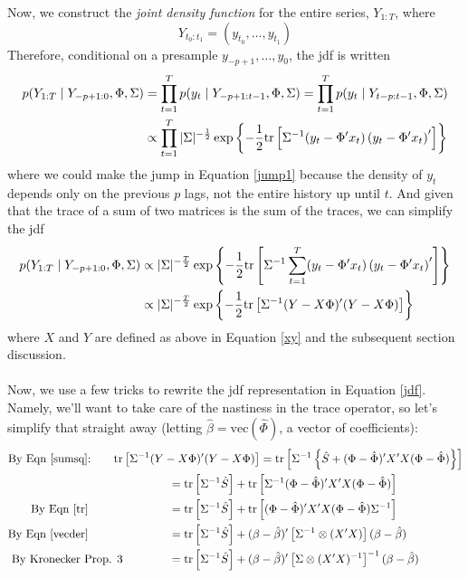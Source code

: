 \documentclass[a4paper,12pt]{scrartcl}
\begin{document}
Now, we construct the \emph{joint density function} for
the entire series, $Y_{1:T}$, where 
    \[ Y_{t_0:t_1} = (y_{t_0}, \ldots, y_{t_1}) \]
Therefore, conditional on a presample $y_{-p+1}, \ldots, y_0$, 
the jdf is written
\begin{align}
    p(Y_{1:T} \; | \; Y_{-p+1:0}, \Phi, \Sigma)
	&= \prod_{t=1}^T p(y_t \; | \; Y_{-p+1:t-1}, \Phi, 
	\Sigma) 
	= \prod_{t=1}^T p(y_t \; | \; Y_{t-p:t-1}, \Phi, \Sigma) 
	\label{jump1} \\
    &\propto \prod_{t=1}^T
	|\Sigma|^{-\frac{1}{2}} 
	\exp\left\{ -\frac{1}{2} \text{tr} \left[ \Sigma^{-1}  
	(y_t - \Phi' x_t)\left(y_t - \Phi' x_t\right)'
	\right]\right\} \notag
\end{align}
where we could make the jump in Equation \ref{jump1}  
because the density of $y_t$ depends only on the previous
$p$ lags, not the entire history up until $t$. 
And given that the trace of a sum of two matrices is the
sum of the traces, we can simplify the jdf
\begin{align}
    p(Y_{1:T} \; | \; Y_{-p+1:0}, \Phi, \Sigma)
	&\propto 
	|\Sigma|^{-\frac{T}{2}} 
	\exp\left\{ -\frac{1}{2} \text{tr} \left[ \Sigma^{-1}  
	\sum^T_{t=1} (y_t - \Phi' x_t)\left(y_t -\Phi' x_t\right)'
	\right]\right\} \notag \\
    &\propto 
	|\Sigma|^{-\frac{T}{2}} 
	\exp\left\{ -\frac{1}{2} \text{tr} \left[ \Sigma^{-1}  
	(Y - X\Phi)'(Y-X\Phi)\right]\right\} \label{jdf}
\end{align}
where $X$ and $Y$ are defined as above in Equation \ref{xy}
and the subsequent section discussion.
\\
\\
Now, we use a few tricks to rewrite the jdf representation
in Equation \ref{jdf}. Namely, we'll want to take care
of the nastiness in the trace operator, so let's simplify 
that straight away (letting $\hat{\beta} = 
\text{vec}(\hat{\Phi})$, a vector of coefficients):
\begin{align*}
    \text{By Eqn \ref{sumsq}:} \qquad 
	\text{tr} & \left[\Sigma^{-1} 
	(Y - X\Phi)'(Y-X\Phi)\right] = 
	\text{tr} \left[\Sigma^{-1} \left\{
	\hat{S} + (\Phi - \hat{\Phi})'
	X'X(\Phi - \hat{\Phi}) \right\}\right]  \\
    &\qquad\qquad= \text{tr} \left[\Sigma^{-1} 
	\hat{S} \right] + \text{tr} \left[ \Sigma^{-1}
	(\Phi - \hat{\Phi})'X'X(\Phi - \hat{\Phi}) \right] \\
    \text{By Eqn \ref{tr}} \qquad \quad
	&\qquad\qquad= \text{tr} \left[\Sigma^{-1}
	\hat{S} \right] + \text{tr} \left[ 
	(\Phi - \hat{\Phi})'X'X(\Phi - \hat{\Phi})
	\Sigma^{-1} \right] \\
    \text{By Eqn \ref{vecder}} \qquad \quad
	&\qquad\qquad= \text{tr} \left[\Sigma^{-1}
	\hat{S} \right] + 
	(\beta - \hat{\beta})'
	\left[\Sigma^{-1} \otimes (X'X)\right] 
	(\beta - \hat{\beta}) \\
    \text{By Kronecker Prop. 3}  
	&\qquad\qquad= \text{tr} \left[\Sigma^{-1}
	\hat{S} \right] + 
	(\beta - \hat{\beta})'
	\left[\Sigma \otimes (X'X)^{-1}\right]^{-1} 
	(\beta - \hat{\beta}) 
\end{align*}
\end{document}
